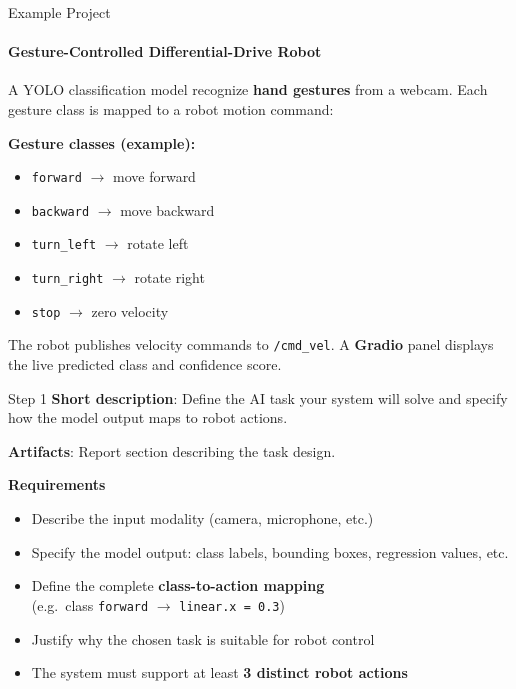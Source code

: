 \documentclass[aspectratio=169]{beamer}
\begin{document}
\begin{frame}[t]{Example Project}
\framesubtitle{Gesture-Controlled Differential-Drive Robot}
\vspace{-0.3cm}
A YOLO classification model recognize \textbf{hand gestures} from a webcam.
Each gesture class is mapped to a robot motion command:
        
\textbf{Gesture classes (example):}
        \begin{itemize}
            \item \texttt{forward} $\to$ move forward
            \item \texttt{backward} $\to$ move backward
            \item \texttt{turn\_left} $\to$ rotate left
            \item \texttt{turn\_right} $\to$ rotate right
            \item \texttt{stop} $\to$ zero velocity
        \end{itemize}
\vspace{0.2cm}
The robot publishes velocity commands to \texttt{/cmd\_vel}.
A \textbf{Gradio} panel displays the live predicted class and confidence score.
\end{frame}


\begin{frame}[t]{Step 1}
\vspace{-0.3cm}
\textbf{Short description}: Define the AI task your system will solve and specify how the model output maps to robot actions.

\textbf{Artifacts}: Report section describing the task design.

\textbf{Requirements}
\footnotesize
\begin{itemize}
    \item Describe the input modality (camera, microphone, etc.)
    \item Specify the model output: class labels, bounding boxes, regression values, etc.
    \item Define the complete \textbf{class-to-action mapping}\\
          (e.g.\ class \texttt{forward} $\to$ \texttt{linear.x = 0.3})
    \item Justify why the chosen task is suitable for robot control
    \item The system must support at least \textbf{3 distinct robot actions}
\end{itemize}
\end{frame}
\end{document}
